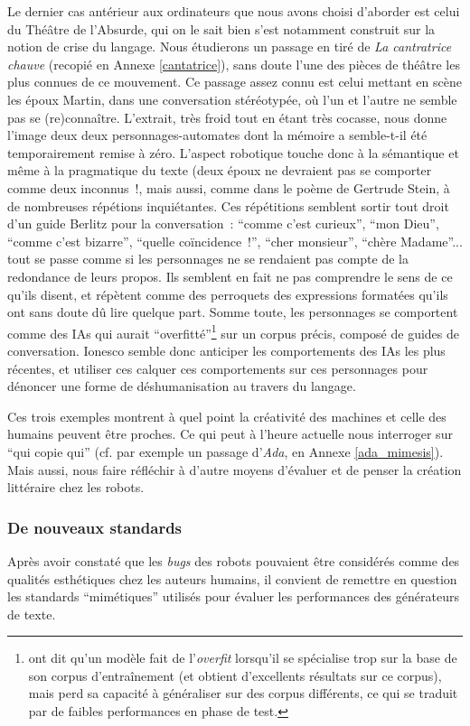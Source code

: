 \documentclass{article}
\begin{document}
				Le dernier cas antérieur aux ordinateurs que nous avons choisi d'aborder est celui du Théâtre de l'Absurde, qui on le sait bien s'est notamment construit sur la notion de crise du langage. Nous étudierons un passage en tiré de \textit{La cantratrice chauve} \cite{ionesco1950} (recopié en Annexe \ref{cantatrice}), sans doute l'une des pièces de théâtre les plus connues de ce mouvement. Ce passage assez connu est celui mettant en scène les époux Martin, dans une conversation stéréotypée, où l'un et l'autre ne semble pas se (re)connaître. L'extrait, très froid tout en étant très cocasse, nous donne l'image deux deux personnages-automates dont la mémoire a semble-t-il été temporairement remise à zéro. L'aspect robotique touche donc à la sémantique et même à la pragmatique du texte (deux époux ne devraient pas se comporter comme deux inconnus~!, mais aussi, comme dans le poème de Gertrude Stein, à de nombreuses répétions inquiétantes. Ces répétitions semblent sortir tout droit d'un guide Berlitz pour la conversation~: ``comme c'est curieux'', ``mon Dieu'', ``comme c'est
				bizarre'', ``quelle coïncidence~!'', ``cher monsieur'', ``chère Madame''... tout se passe comme si les personnages ne se rendaient pas compte de la redondance de leurs propos. Ils semblent en fait ne pas comprendre le sens de ce qu'ils disent, et répètent comme des perroquets des expressions formatées qu'ils ont sans doute dû lire quelque part. Somme toute, les personnages se comportent comme des IAs qui aurait ``overfitté''\footnote{ont dit qu'un modèle fait de l'\textit{overfit} lorsqu'il se spécialise trop sur la base de son corpus d'entraînement (et obtient d'excellents résultats sur ce corpus), mais perd sa capacité à généraliser sur des corpus différents, ce qui se traduit par de faibles performances en phase de test.} sur un corpus précis, composé de guides de conversation. Ionesco semble donc anticiper les comportements des IAs les plus récentes, et utiliser ces calquer ces comportements sur ces personnages pour dénoncer une forme de déshumanisation au travers du langage.
				
				
				Ces trois exemples montrent à quel point la créativité des machines et celle des humains peuvent être proches. Ce qui peut à l'heure actuelle nous interroger sur ``qui copie qui'' (cf. par exemple un passage d'\textit{Ada}, en Annexe \ref{ada_mimesis}). Mais aussi, nous faire réfléchir à d'autre moyens d'évaluer et de penser la création littéraire chez les robots.

			\subsubsection{De nouveaux standards}
				Après avoir constaté que les \textit{bugs} des robots pouvaient être considérés comme des qualités esthétiques chez les auteurs humains, il convient de remettre en question les standards ``mimétiques'' utilisés pour évaluer les performances des générateurs de texte.
				
\end{document}
